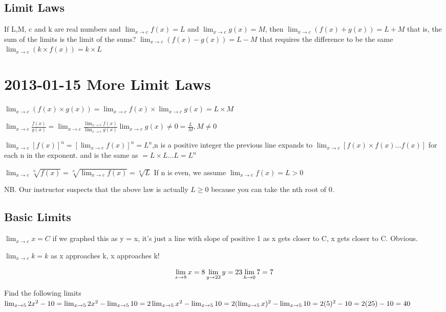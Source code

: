\documentclass[12pt]{article}
\begin{document}
\subsection{Limit Laws}
If L,M, c and k are real numbers and 
$\lim_{x \to c} f(x) = L$ and $\lim_{x \to c} g(x) = M$, then 
$\lim_{x \to c}(f(x) + g(x)) = L+M$
that is, the sum of the limits is the limit of the sums?
$\lim_{x \to c}(f(x) - g(x)) = L-M$
that requires the difference to be the same
$\lim_{x \to c}( k \times f(x)) = k \times L$

\section{2013-01-15 More Limit Laws}

$\lim_{x \to c}(f(x) \times g(x)) = \lim_{x \to c}f(x) \times \lim_{x \to c}g(x) = L \times M$

$\lim_{x \to c} \frac{f(x)}{g(x)} = \lim_{x \to c} \frac{\lim_{x \to c} f(x)}{\lim_{x \to c} g(x)} \lim_{x \to
  c}g(x) \neq 0 = \frac{L}{M},M \neq 0$

$\lim_{x \to c}[f(x)]^n = [\lim_{x \to c}f(x)]^n = L^n$,n is a positive integer
the previous line expands to $\lim_{x \to c}[f(x) \times f(x) ... f(x)]$ for each n in the exponent.
and is the same as $=L \times L ... L = L^n$

$\lim_{x \to c}\sqrt[n]{f(x)} = \sqrt[n]{\lim_{x\to c}f(x)} = \sqrt[n]{L}$
If n is even, we assume $\lim_{x \to c}f(x) = L > 0$

NB. Our instructor suspects that the above law is actually $L \geq 0$ because you can take the nth root of 0.

\subsection{Basic Limits}

$\lim_{x \to c}x = C$
if we graphed this as y = x, it's just a line with slope of positive 1
as x gets closer to C, x gets closer to C. Obvious.

$\lim_{x \to c}k = k$ as x approaches k, x approaches k!

$$
\lim_{x \to 8} x = 8\\
\lim_{y \to 23} y = 23\\
\lim_{h \to 0} 7 = 7
$$

Find the following limits
$\lim_{x \to 5}2x^2 - 10\\
=\lim_{x \to 5}2x^2 - \lim_{x \to 5}10\\
=2\lim_{x \to 5}x^2 - \lim_{x \to 5}10\\
=2(\lim_{x \to 5}x)^2 - \lim_{x \to 5}10\\
=2(5)^2 - 10\\
=2(25) - 10\\
= 40$
\end{document}
